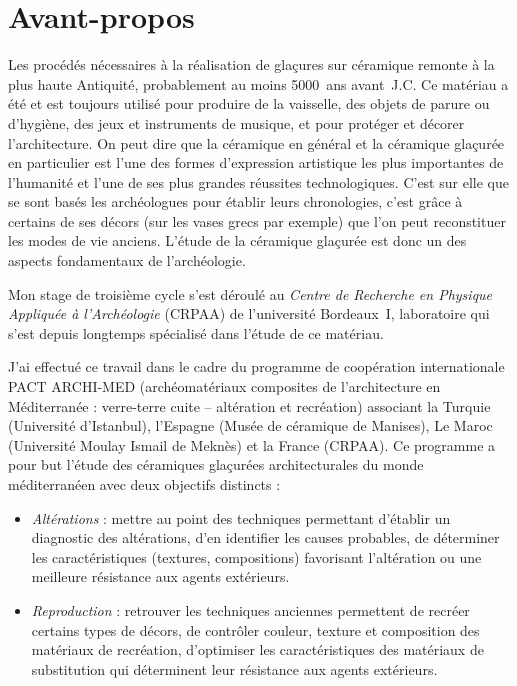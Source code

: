 \chapter*{Avant-propos}

Les procédés nécessaires à la réalisation de glaçures sur céramique 
remonte à la plus haute Antiquité, probablement au moins 
\num{5000}~ans avant~J.C. Ce matériau a été et est toujours utilisé 
pour produire de la vaisselle, des objets de parure ou d'hygiène, 
des jeux et instruments de musique, et pour protéger et décorer 
l'architecture. On peut dire que la céramique en général et la 
céramique glaçurée en particulier est l'une des formes d'expression 
artistique les plus importantes de l'humanité et l'une de ses plus 
grandes réussites technologiques. C'est sur elle que se sont basés les 
archéologues pour établir leurs chronologies, c'est grâce à certains 
de ses décors (sur les vases grecs par exemple) que l'on peut 
reconstituer les modes de vie anciens. L'étude de la céramique 
glaçurée est donc un des aspects fondamentaux de l'archéologie.

Mon stage de troisième cycle s'est déroulé au \emph{Centre de 
Recherche en Physique Appliquée à l'Archéologie} (CRPAA) de 
l'université Bordeaux~I, laboratoire qui s'est depuis longtemps 
spécialisé dans l'étude de ce matériau.

J'ai effectué ce travail dans le cadre du programme de coopération 
internationale PACT ARCHI-MED (archéomatériaux composites de 
l'architecture en Méditerranée : verre-terre cuite -- altération et 
recréation) associant la Turquie (Université d'Istanbul), l'Espagne 
(Musée de céramique de Manises), Le Maroc (Université Moulay Ismail 
de Meknès) et la France (CRPAA). Ce programme a pour but l'étude des 
céramiques glaçurées architecturales du monde méditerranéen avec deux 
objectifs distincts :

\begin{itemize}
  \item \emph{Altérations} : mettre au point des techniques 
        permettant d'établir un diagnostic des altérations, 
        d'en identifier les causes probables, de déterminer les 
        caractéristiques (textures, compositions) favorisant 
        l'altération ou une meilleure résistance aux agents extérieurs.
  \item \emph{Reproduction} : retrouver les techniques anciennes 
        permettent de recréer certains types de décors, de contrôler 
        couleur, texture et composition des matériaux de recréation, 
        d'optimiser les caractéristiques des matériaux de substitution 
        qui déterminent leur résistance aux agents extérieurs.
\end{itemize}

